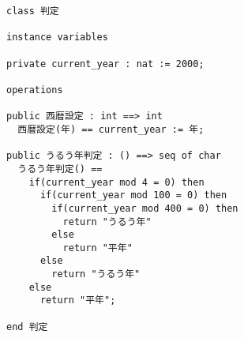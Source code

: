 \documentclass[uplatex, report, a4j, 10pt]{jsbook}
\begin{document}
\lstset{language=}
\begin{figure}[tp]
  \begin{lstlisting}[caption=操作を含むVDM++仕様,label=fig:multiple_definition]
class 判定

instance variables

private current_year : nat := 2000;

operations

public 西暦設定 : int ==> int
  西暦設定(年) == current_year := 年;

public うるう年判定 : () ==> seq of char
  うるう年判定() ==
    if(current_year mod 4 = 0) then
      if(current_year mod 100 = 0) then
        if(current_year mod 400 = 0) then
          return "うるう年"
        else
          return "平年"
      else
        return "うるう年"
    else
      return "平年";

end 判定
\end{lstlisting}
\end{figure}

\end{document}
